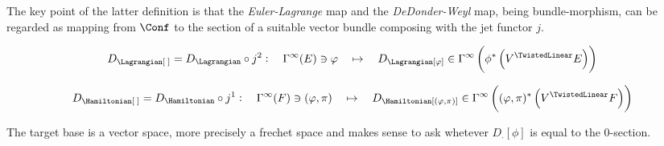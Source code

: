\documentclass[a4paper,12pt,fleqn]{scrartcl}  %
\begin{document}
The key point of the latter definition is that the \emph{Euler-Lagrange} map and the \emph{DeDonder-Weyl} map, being bundle-morphism, can be regarded as mapping from $\Conf$ to the section of a suitable vector bundle composing with the jet functor $j$.

\begin{equation}
	D_\Lagrangian[\; ] = D_\Lagrangian \circ j^2 : \quad \Gamma^\infty(E) \ni \varphi \quad \mapsto \quad D_\Lagrangian[ \varphi ] \in \Gamma^\infty \left( \phi^\ast \left(V^\TwistedLinear E \right)\right)
\end{equation}

\begin{equation}
	D_\Hamiltonian[\; ] = D_\Hamiltonian \circ j^1 : \quad \Gamma^\infty(F) \ni (\varphi,\pi) \quad \mapsto \quad D_\Hamiltonian[ (\varphi,\pi) ] \in \Gamma^\infty \left( (\varphi,\pi)^\ast \left(V^\TwistedLinear F \right)\right)
\end{equation}

The target base is a vector space, more precisely a frechet space \cite[Cap.2]{Ban} and makes sense to ask whetever $D_\cdot [\phi]$ is equal to the 0-section.
\end{document}
